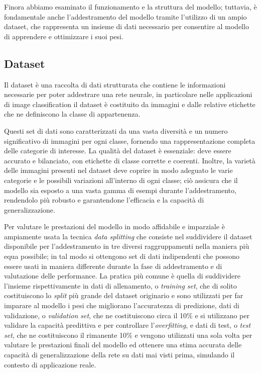 Finora abbiamo esaminato il funzionamento e la struttura del modello; tuttavia, è fondamentale anche l'addestramento del modello tramite l'utilizzo di un ampio dataset, che rappresenta un insieme di dati necessario per consentire al modello di apprendere e ottimizzare i suoi pesi.


\subsection{Dataset} %

Il dataset è una raccolta di dati strutturata che contiene le informazioni necessarie per poter addestrare una rete neurale, in particolare nelle applicazioni di image classification il dataset è costituito da immagini e dalle relative etichette che ne definiscono la classe di appartenenza.

Questi set di dati sono caratterizzati da una vasta diversità e un numero significativo di immagini per ogni classe, fornendo una rappresentazione completa delle categorie di interesse. La qualità del dataset è essenziale: deve essere accurato e bilanciato, con etichette di classe corrette e coerenti. Inoltre, la varietà delle immagini presenti nel dataset deve coprire in modo adeguato le varie categorie e le possibili variazioni all'interno di ogni classe; ciò assicura che il modello sia esposto a una vasta gamma di esempi durante l'addestramento, rendendolo più robusto e garantendone l'efficacia e la capacità di generalizzazione.

Per valutare le prestazioni del modello in modo affidabile e imparziale è ampiamente usata la tecnica \textit{data splitting} che consiste nel suddividere il dataset disponibile per l'addestramento in tre diversi raggruppamenti nella maniera più equa possibile; in tal modo si ottengono set di dati indipendenti che possono essere usati in maniera differente durante la fase di addestramento e di valutazione delle performance.
La pratica più comune è quella di suddividere l'insieme rispettivamente in dati di allenamento, o \textit{training set}, che di solito costituiscono lo \textit{split} più grande del dataset originario e sono utilizzati per far imparare al modello i pesi che migliorano l'accuratezza di predizione, dati di validazione, o \textit{validation set}, che ne costituiscono circa il 10\% e si utilizzano per validare la capacità predittiva e per controllare l'\textit{overfitting}, e dati di test, o \textit{test set}, che ne costituiscono il rimanente 10\% e vengono utilizzati una sola volta per valutare le prestazioni finali del modello ed ottenere una stima accurata delle capacità di generalizzazione della rete su dati mai visti prima, simulando il contesto di applicazione reale.

